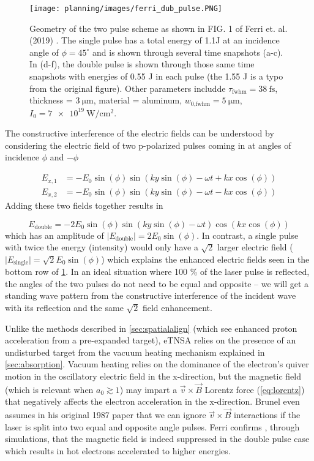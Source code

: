 \begin{figure}
	\centering 
	\texttt{[image: planning/images/ferri\_dub\_pulse.PNG]}
	\caption{Geometry of the two pulse scheme as shown in FIG. 1 of Ferri et. al. (2019) \cite{Ferri_2019_Nat_Comm}. The single pulse has a total energy of 1.1J at an incidence angle of $\phi=45^\circ$ and is shown through several time snapshots (a-c). In (d-f), the double pulse is shown through those same time snapshots with energies of 0.55 J in each pulse (the 1.55 J is a typo from the original figure). Other parameters includde $\tau_\text{fwhm} = \SI{38}{\femto \second}$, thickness = $\SI{3}{\micro \meter}$, material = aluminum, $w_\text{0,fwhm} = \SI{5}{\micro \meter}$, $I_0 = \SI{7e19}{\watt \per \centi \meter \squared}$.}
	\label{fig:ferri_dub_pulse}
\end{figure}
The constructive interference of the electric fields can be understood by considering the electric field of two p-polarized pulses coming in at angles of incidence $\phi$ and $-\phi$

\begin{align}
	E_{x,1} &= -E_0 \sin(\phi) \sin(k y \sin(\phi) - \omega t + k x \cos(\phi)) \\
	E_{x,2} &= -E_0 \sin(\phi) \sin(k y \sin(\phi) - \omega t - k x \cos(\phi))
\end{align}
Adding these two fields together results in 

\begin{equation}
	E_\text{double} = -2 E_0 \sin(\phi) \sin(k y \sin(\phi) - \omega t) \cos(k x \cos(\phi))
\end{equation}
which has an amplitude of $\lvert E_\text{double} \rvert = 2 E_0 \sin(\phi)$. In contrast, a single pulse with twice the energy (intensity) would only have a $\sqrt{2}$ larger electric field ($\lvert E_\text{single} \rvert = \sqrt{2} E_0 \sin(\phi)$) which explains the enhanced electric fields seen in the bottom row of \cref{fig:ferri_dub_pulse}. In an ideal situation where 100 \% of the laser pulse is reflected, the angles of the two pulses do not need to be equal and opposite -- we will get a standing wave pattern from the constructive interference of the incident wave with its reflection and the same $\sqrt{2}$ field enhancement.  

Unlike the methods described in \cref{sec:spatialalign} (which see enhanced proton acceleration from a pre-expanded target), \gls{eTNSA} relies on the presence of an undisturbed target from the vacuum heating mechanism \cite{Brunel_1987_PRL} explained in \cref{sec:absorption}. Vacuum heating relies on the dominance of the electron's quiver motion in the oscillatory electric field in the x-direction, but the magnetic field (which is relevant when $a_0 \gtrsim 1$) may impart a $\vec{v} \times \vec{B}$ Lorentz force (\cref{eq:lorentz}) that negatively affects the electron acceleration in the x-direction. Brunel even assumes in his original 1987 paper \cite{Brunel_1987_PRL} that we can ignore $\vec{v} \times \vec{B}$ interactions if the laser is split into two equal and opposite angle pulses. Ferri confirms \cite{Ferri_2019_Nat_Comm}, through simulations, that the magnetic field is indeed suppressed in the double pulse case which results in hot electrons accelerated to higher energies. 

